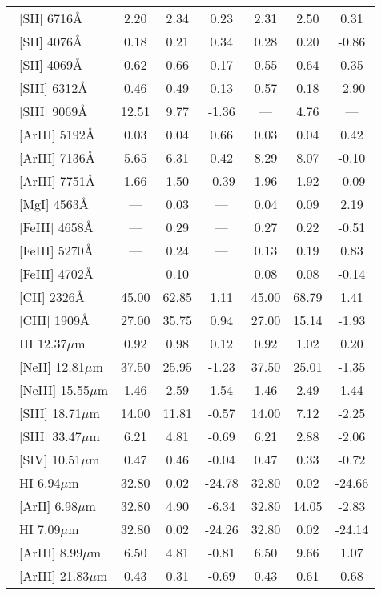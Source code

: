 \begin{table*}
\begin{tabular}{lcccccc}
~[SII] 6716\AA & 2.20 &   2.34 &   0.23 &2.31 &   2.50 &   0.31 \\ 
~[SII] 4076\AA & 0.18 &   0.21 &   0.34 &0.28 &   0.20 &  -0.86 \\ 
~[SII] 4069\AA & 0.62 &   0.66 &   0.17 &0.55 &   0.64 &   0.35 \\ 
~[SIII] 6312\AA & 0.46 &   0.49 &   0.13 &0.57 &   0.18 &  -2.90 \\ 
~[SIII] 9069\AA & 12.51 &   9.77 &  -1.36 &--- &   4.76 &    --- \\ 
~[ArIII] 5192\AA & 0.03 &   0.04 &   0.66 &0.03 &   0.04 &   0.42 \\ 
~[ArIII] 7136\AA & 5.65 &   6.31 &   0.42 &8.29 &   8.07 &  -0.10 \\ 
~[ArIII] 7751\AA & 1.66 &   1.50 &  -0.39 &1.96 &   1.92 &  -0.09 \\ 
~[MgI] 4563\AA & --- &   0.03 &    --- &0.04 &   0.09 &   2.19 \\ 
~[FeIII] 4658\AA & --- &   0.29 &    --- &0.27 &   0.22 &  -0.51 \\ 
~[FeIII] 5270\AA & --- &   0.24 &    --- &0.13 &   0.19 &   0.83 \\ 
~[FeIII] 4702\AA & --- &   0.10 &    --- &0.08 &   0.08 &  -0.14 \\ 
\hline 
~[CII] 2326\AA & 45.00 &  62.85 &   1.11 &45.00 &  68.79 &   1.41 \\ 
~[CIII] 1909\AA & 27.00 &  35.75 &   0.94 &27.00 &  15.14 &  -1.93 \\ 
\hline 
~HI 12.37$\mu$m & 0.92 &   0.98 &   0.12 &0.92 &   1.02 &   0.20 \\ 
~[NeII] 12.81$\mu$m & 37.50 &  25.95 &  -1.23 &37.50 &  25.01 &  -1.35 \\ 
~[NeIII] 15.55$\mu$m & 1.46 &   2.59 &   1.54 &1.46 &   2.49 &   1.44 \\ 
~[SIII] 18.71$\mu$m & 14.00 &  11.81 &  -0.57 &14.00 &   7.12 &  -2.25 \\ 
~[SIII] 33.47$\mu$m & 6.21 &   4.81 &  -0.69 &6.21 &   2.88 &  -2.06 \\ 
~[SIV] 10.51$\mu$m & 0.47 &   0.46 &  -0.04 &0.47 &   0.33 &  -0.72 \\ 
~HI 6.94$\mu$m & 32.80 &   0.02 & -24.78 &32.80 &   0.02 & -24.66 \\ 
~[ArII] 6.98$\mu$m & 32.80 &   4.90 &  -6.34 &32.80 &  14.05 &  -2.83 \\ 
~HI 7.09$\mu$m & 32.80 &   0.02 & -24.26 &32.80 &   0.02 & -24.14 \\ 
~[ArIII] 8.99$\mu$m & 6.50 &   4.81 &  -0.81 &6.50 &   9.66 &   1.07 \\ 
~[ArIII] 21.83$\mu$m & 0.43 &   0.31 &  -0.69 &0.43 &   0.61 &   0.68 \\ 

    \hline
  \end{tabular}
\end{table*} 
        